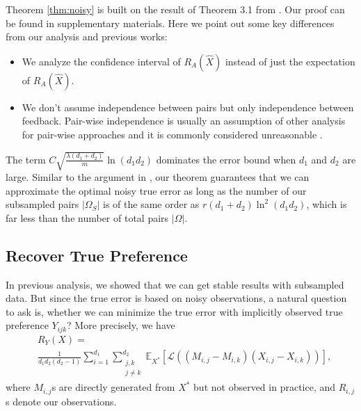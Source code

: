 \documentclass{article}
\numberwithin{equation}{section}
\newtheorem{sampling strategy}{Sampling Strategy}
\begin{document}
Theorem \ref{thm:noisy} is built on the result of Theorem 3.1 from \cite{cr}. Our proof can be found in supplementary materials. Here we point out some key differences from our analysis and previous works:
\begin{itemize}
    \item We analyze the confidence interval of $R_A(\hat{X})$ instead of just the expectation of $R_A(\hat{X})$.
    \item We don't assume independence between pairs but only independence between feedback. Pair-wise independence is usually an assumption of other analysis for pair-wise approaches and it is commonly considered unreasonable \cite{listwise}. 
\end{itemize}
The term $C \sqrt{\frac{\lambda (d_1 + d_2)}{m}} \ln(d_1 d_2)$ dominates the error bound when $d_1$ and $d_2$ are large.
Similar to the argument in \cite{cr}, our theorem guarantees that we can approximate the optimal noisy true error as long as the number of our subsampled pairs $|\Omega_S|$ is of the same order as $r(d_1 + d_2)\ln^2(d_1 d_2)$, which is far less than the number of total pairs $|\Omega|$.


\subsection{Recover True Preference}

In previous analysis, we showed that we can get stable results with subsampled data. But since the true error is based on noisy observations, a natural question to ask is, whether we can  minimize the true error with implicitly observed true preference $Y_{ijk}$? More precisely, we have 
\begin{equation}
    \begin{aligned}
    & R_Y(X) = \\
    & \frac{1}{d_1 d_2(d_2-1)} \sum_{i=1}^{d_1}\sum_{\substack{j,k\\ j \neq k} }^{d_2} \mathbb{E}_{X^*} [ \mathcal{L}( (M_{i,j} - M_{i,k})(X_{i,j} - X_{i,k}) ) ],   \nonumber
    \end{aligned}
\end{equation} 
where $M_{i,j}$s are directly generated from $X^*$ but not observed in practice, and  $R_{i,j}$s denote our observations.
\end{document}

